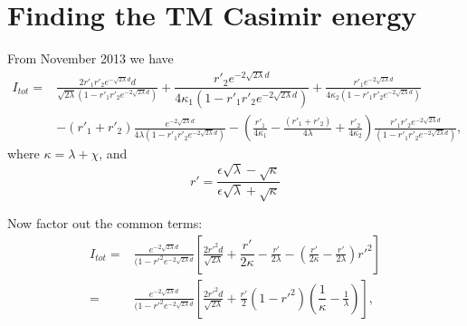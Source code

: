 \section{Finding the TM Casimir energy}

From November 2013 we have
\begin{align}
I_{tot}%
=& 
  \frac{2r'_1r'_2 e^{-\sqrt{2\lambda}d}d}{\sqrt{2\lambda}(1-r'_1r'_2 e^{-2\sqrt{2\lambda}d})} 
+\dfrac{r'_2 e^{-2\sqrt{2\lambda}d}}{4\kappa_1(1-r'_1r'_2 e^{-2\sqrt{2\lambda}d})} 
+\frac{r'_1 e^{-2\sqrt{2\lambda}d}}{4\kappa_2(1-r'_1r'_2 e^{-2\sqrt{2\lambda}d})}  \nonumber\\
& - (r'_1+r'_2)\frac{e^{-2\sqrt{2\lambda}d}}{4\lambda(1-r'_1r'_2e^{-2\sqrt{2\lambda}d})}
 -   \left(\frac{r'_1}{4\kappa_1}-\frac{(r'_1+r'_2)}{4\lambda}  
+ \frac{r'_2}{4\kappa_2}\right)\frac{r'_1r'_2 e^{-2\sqrt{2\lambda}d}}{(1-r'_1r'_2 e^{-2\sqrt{2\lambda}d})},
\end{align}
where $\kappa = \lambda+\chi$, and 
\begin{equation}
r' =  \frac{\epsilon\sqrt{\lambda}-\sqrt{\kappa}}{\epsilon\sqrt{\lambda}+\sqrt{\kappa}}
\end{equation}

Now factor out the common terms: 
\begin{align}
I_{tot}=&  \frac{e^{-2\sqrt{2\lambda}d}}{(1-r'^2e^{-2\sqrt{2\lambda}d}}\left[
 \frac{2r'^2d}{\sqrt{2\lambda}}+ \dfrac{r'}{2\kappa}  -\frac{ r'}{2\lambda} 
- \left(\frac{r'}{2\kappa}-\frac{r'}{2\lambda}\right)r'^2\right]\\
=&  \frac{e^{-2\sqrt{2\lambda}d}}{(1-r'^2e^{-2\sqrt{2\lambda}d}}\left[
\frac{2r'^2d}{\sqrt{2\lambda}}+ \frac{r'}{2}(1-r'^2)\left(\dfrac{1}{\kappa}  -\frac{1}{\lambda}\right)\right],
\end{align}



